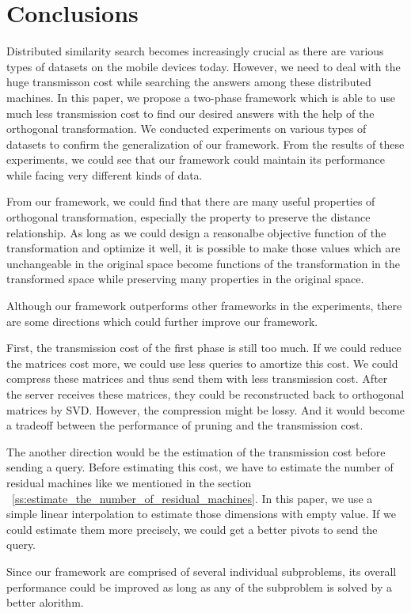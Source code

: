 \chapter{Conclusions}
\label{c:conclusions}

Distributed similarity search becomes increasingly crucial as there are various types of datasets on the mobile devices today.  However, we need to deal with the huge transmisson cost while searching the answers among these distributed machines.  In this paper, we propose a two-phase framework which is able to use much less transmission cost to find our desired answers with the help of the orthogonal transformation.  We conducted experiments on various types of datasets to confirm the generalization of our framework.  From the results of these experiments, we could see that our framework could maintain its performance while facing very different kinds of data.

From our framework, we could find that there are many useful properties of orthogonal transformation, especially the property to preserve the distance relationship.  As long as we could design a reasonalbe objective function of the transformation and optimize it well, it is possible to make those values which are unchangeable in the original space become functions of the transformation in the transformed space while preserving many properties in the original space.

Although our framework outperforms other frameworks in the experiments, there are some directions which could further improve our framework.  

First, the transmission cost of the first phase is still too much.  If we could reduce the matrices cost more, we could use less queries to amortize this cost.  We could compress these matrices and thus send them with less transmission cost.  After the server receives these matrices, they could be reconstructed back to orthogonal matrices by SVD.  However, the compression might be lossy.  And it would become a tradeoff between the performance of pruning and the transmission cost.

The another direction would be the estimation of the transmission cost before sending a query.  Before estimating this cost, we have to estimate the number of residual machines like we mentioned in the section ~\ref{ss:estimate_the_number_of_residual_machines}.  In this paper, we use a simple linear interpolation to estimate those dimensions with empty value.  If we could estimate them more precisely, we could get a better pivots to send the query.

Since our framework are comprised of several individual subproblems, its overall performance could be improved as long as any of the subproblem is solved by a better alorithm.